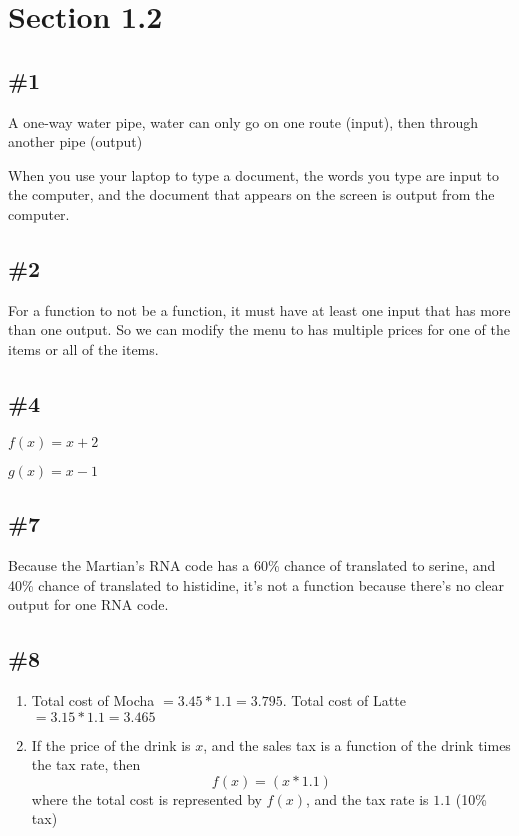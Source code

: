 \documentclass[12pt]{article}
\begin{document}
\section*{Section 1.2}
\subsection*{\#1}
A one-way water pipe, water can only go on one route (input), then through another pipe (output)

\noindent When you use your laptop to type a document, the words you type are input to the computer, and the document that appears on the screen is output from the computer.

\subsection*{\#2}
For a function to not be a function, it must have at least one input that has more than one output. So we can modify the menu to has multiple prices for one of the items or all of the items.

\subsection*{\#4}
$f(x) = x + 2$

\noindent $g(x) = x - 1$

\subsection*{\#7}
Because the Martian's RNA code has a 60\% chance of translated to serine, and 40\% chance of translated to histidine, it's not a function because there's no clear output for one RNA code.

\subsection*{\#8}
\begin{enumerate}[label=\alph*.]
    \item Total cost of Mocha $= 3.45 * 1.1 = 3.795$. Total cost of Latte $= 3.15 * 1.1 = 3.465$
    \item If the price of the drink is $x$, and the sales tax is a function of the drink times the tax rate, then
    \begin{equation}
        f(x) = (x * 1.1)
    \end{equation}
    where the total cost is represented by $f(x)$, and the tax rate is $1.1$ (10\% tax)
\end{enumerate}
\end{document}
